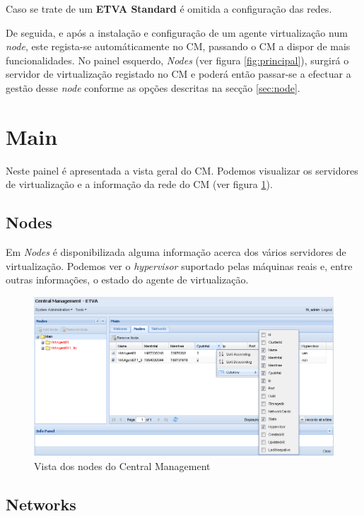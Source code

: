 Caso se trate de um {\bf ETVA Standard} é omitida a configuração das redes.

De seguida, e após a instalação e configuração de um agente virtualização num \emph{node}, este regista-se automáticamente no CM, passando o CM a dispor de mais funcionalidades.
No painel esquerdo, \emph{Nodes} (ver figura \ref{fig:principal}), surgirá o servidor de virtualização registado no CM e poderá então passar-se a efectuar a gestão desse \emph{node} conforme as opções descritas na secção \ref{sec:node}.

\pagebreak

\section{Main}

Neste painel é apresentada a vista geral do CM.
Podemos visualizar os servidores de virtualização e a informação da rede do CM (ver figura \ref{fig:main_nodes}).

\subsection{Nodes}

Em \emph{Nodes} é disponibilizada alguma informação acerca dos vários servidores de virtualização. Podemos ver o \emph{hypervisor} suportado pelas máquinas reais e, entre outras informações, o estado do agente de virtualização.
\begin{figure}[H]
	\begin{center}
	\includegraphics[scale=0.5]{screenshots/main_nodes.png}
	\caption{Vista dos nodes do Central Management}
	\label{fig:main_nodes}
	\end{center}
\end{figure}

\subsection{Networks}

